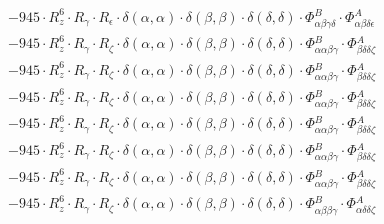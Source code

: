 \documentclass{article}
\begin{document}
\begin{subequations}
\begin{gather}
\begin{array}{c}
 \\[0.2em] 		 - 945 \cdot R_{z}^{6} \cdot R_{\gamma{}} \cdot R_{\epsilon{}} \cdot \delta{}\left(\alpha{}, \alpha{}\right) \cdot \delta{}\left(\beta{}, \beta{}\right) \cdot \delta{}\left(\delta{}, \delta{}\right) \cdot \Phi{}^{B}_{\alpha{}\beta{}\gamma{}\delta{}} \cdot \Phi{}^{A}_{\alpha{}\beta{}\delta{}\epsilon{}} 
 \\[0.2em] 		 - 945 \cdot R_{z}^{6} \cdot R_{\gamma{}} \cdot R_{\zeta{}} \cdot \delta{}\left(\alpha{}, \alpha{}\right) \cdot \delta{}\left(\beta{}, \beta{}\right) \cdot \delta{}\left(\delta{}, \delta{}\right) \cdot \Phi{}^{B}_{\alpha{}\alpha{}\beta{}\gamma{}} \cdot \Phi{}^{A}_{\beta{}\delta{}\delta{}\zeta{}} 
 \\[0.2em] 		 - 945 \cdot R_{z}^{6} \cdot R_{\gamma{}} \cdot R_{\zeta{}} \cdot \delta{}\left(\alpha{}, \alpha{}\right) \cdot \delta{}\left(\beta{}, \beta{}\right) \cdot \delta{}\left(\delta{}, \delta{}\right) \cdot \Phi{}^{B}_{\alpha{}\alpha{}\beta{}\gamma{}} \cdot \Phi{}^{A}_{\beta{}\delta{}\delta{}\zeta{}} 
 \\[0.2em] 		 - 945 \cdot R_{z}^{6} \cdot R_{\gamma{}} \cdot R_{\zeta{}} \cdot \delta{}\left(\alpha{}, \alpha{}\right) \cdot \delta{}\left(\beta{}, \beta{}\right) \cdot \delta{}\left(\delta{}, \delta{}\right) \cdot \Phi{}^{B}_{\alpha{}\alpha{}\beta{}\gamma{}} \cdot \Phi{}^{A}_{\beta{}\delta{}\delta{}\zeta{}} 
 \\[0.2em] 		 - 945 \cdot R_{z}^{6} \cdot R_{\gamma{}} \cdot R_{\zeta{}} \cdot \delta{}\left(\alpha{}, \alpha{}\right) \cdot \delta{}\left(\beta{}, \beta{}\right) \cdot \delta{}\left(\delta{}, \delta{}\right) \cdot \Phi{}^{B}_{\alpha{}\alpha{}\beta{}\gamma{}} \cdot \Phi{}^{A}_{\beta{}\delta{}\delta{}\zeta{}} 
 \\[0.2em] 		 - 945 \cdot R_{z}^{6} \cdot R_{\gamma{}} \cdot R_{\zeta{}} \cdot \delta{}\left(\alpha{}, \alpha{}\right) \cdot \delta{}\left(\beta{}, \beta{}\right) \cdot \delta{}\left(\delta{}, \delta{}\right) \cdot \Phi{}^{B}_{\alpha{}\alpha{}\beta{}\gamma{}} \cdot \Phi{}^{A}_{\beta{}\delta{}\delta{}\zeta{}} 
 \\[0.2em] 		 - 945 \cdot R_{z}^{6} \cdot R_{\gamma{}} \cdot R_{\zeta{}} \cdot \delta{}\left(\alpha{}, \alpha{}\right) \cdot \delta{}\left(\beta{}, \beta{}\right) \cdot \delta{}\left(\delta{}, \delta{}\right) \cdot \Phi{}^{B}_{\alpha{}\alpha{}\beta{}\gamma{}} \cdot \Phi{}^{A}_{\beta{}\delta{}\delta{}\zeta{}} 
 \\[0.2em] 		 - 945 \cdot R_{z}^{6} \cdot R_{\gamma{}} \cdot R_{\zeta{}} \cdot \delta{}\left(\alpha{}, \alpha{}\right) \cdot \delta{}\left(\beta{}, \beta{}\right) \cdot \delta{}\left(\delta{}, \delta{}\right) \cdot \Phi{}^{B}_{\alpha{}\beta{}\beta{}\gamma{}} \cdot \Phi{}^{A}_{\alpha{}\delta{}\delta{}\zeta{}} 

\end{array}
\end{gather}
\end{subequations}
\end{document}

